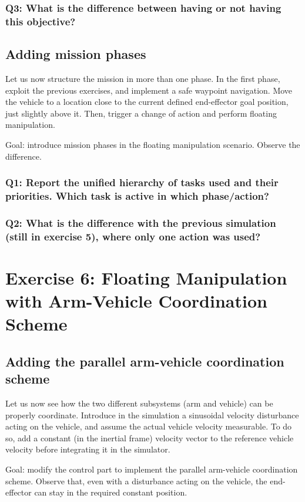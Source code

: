 \documentclass{article}
\begin{document}
\subsubsection{Q3: What is the difference between having or not having this objective?}

\subsection{Adding mission phases}
Let us now structure the mission in more than one phase. In the first phase, exploit the previous exercises, and implement a safe waypoint navigation. Move the vehicle to a location close to the current defined end-effector goal position, just slightly above it. Then, trigger a change of action and perform floating manipulation.

Goal: introduce mission phases in the floating manipulation scenario. Observe the difference.

\subsubsection{Q1: Report the unified hierarchy of tasks used and their priorities. Which task is active in which phase/action?}

\subsubsection{Q2: What is the difference with the previous simulation (still in exercise 5), where only one action was used?}

\clearpage
\section{Exercise 6: Floating Manipulation with Arm-Vehicle Coordination Scheme}
\subsection{Adding the parallel arm-vehicle coordination scheme}
Let us now see how the two different subsystems (arm and vehicle) can be properly coordinate. Introduce in the simulation a sinusoidal velocity disturbance acting on the vehicle, and assume the actual vehicle velocity measurable. To do so, add a constant (in the inertial frame) velocity vector to the reference vehicle velocity before integrating it in the simulator. 

Goal: modify the control part to implement the parallel arm-vehicle coordination scheme. Observe that, even with a disturbance acting on the vehicle, the end-effector can stay in the required constant position.
\end{document}
